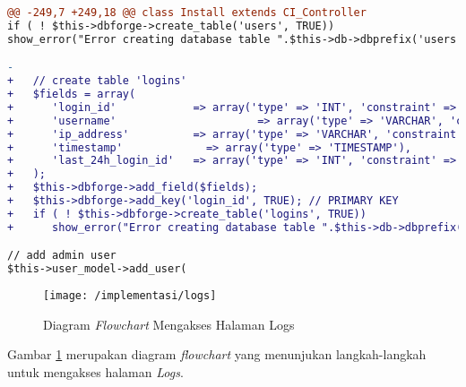 \begin{lstlisting}[language=diff, caption=Perubahan kode program pada \textit{Install.php}, label=lst:9, basicstyle=\ttfamily, frame=single,
columns=fullflexible, keepspaces=true, breaklines=true]
@@ -249,7 +249,18 @@ class Install extends CI_Controller
if ( ! $this->dbforge->create_table('users', TRUE))
show_error("Error creating database table ".$this->db->dbprefix('users'));

-
+   // create table 'logins'
+   $fields = array(
+      'login_id'            => array('type' => 'INT', 'constraint' => 11, 'unsigned' => TRUE, 'auto_increment' => TRUE),
+      'username'                      => array('type' => 'VARCHAR', 'constraint' => 20),
+      'ip_address'          => array('type' => 'VARCHAR', 'constraint' => 15),
+      'timestamp'             => array('type' => 'TIMESTAMP'),
+      'last_24h_login_id'   => array('type' => 'INT', 'constraint' => 11, 'null' => TRUE),
+   );
+   $this->dbforge->add_field($fields);
+   $this->dbforge->add_key('login_id', TRUE); // PRIMARY KEY
+   if ( ! $this->dbforge->create_table('logins', TRUE))
+      show_error("Error creating database table ".$this->db->dbprefix('logins'));

// add admin user
$this->user_model->add_user(
\end{lstlisting}

\begin{figure}[H]
	\centering  
	\texttt{[image: /implementasi/logs]}  
	\caption[Diagram \textit{Flowchart} Mengakses Halaman Logs]{Diagram \textit{Flowchart} Mengakses Halaman Logs} 
	\label{fig:ilogs} 
\end{figure}
Gambar \ref{fig:ilogs} merupakan diagram \textit{flowchart} yang menunjukan langkah-langkah untuk mengakses halaman \textit{Logs}.


